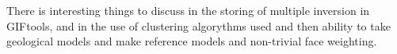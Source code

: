 There is interesting things to discuss in the storing of multiple inversion in GIFtools, and in the use of clustering algorythms used and then ability to take geological models and make reference models and non-trivial face weighting.

\endinput

 Interestingly, the assumption that all magnetizations are in the same direction also assumes that all Koenigsberger ratios are equal.

Any text after an \endinput is ignored.
You could put scraps here or things in progress.
